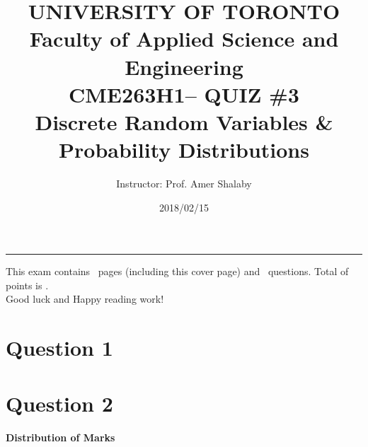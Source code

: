 \documentclass[letterpaper,12pt,addpoints]{exam}
\newcommand{\university}{UNIVERSITY OF TORONTO}
\newcommand{\faculty}{Faculty of Applied Science and Engineering}
\newcommand{\class}{CME263H1}
\newcommand{\examnum}{QUIZ \#3}
\newcommand{\content}{Discrete Random Variables \& Probability Distributions}
\newcommand{\examdate}{2018/02/15}
\begin{document}
\title{\@@title}
\title{\Large \textbf{\university\\ \faculty\\
\bigskip
\class -- \examnum \\ \content}}
\author{Instructor: Prof. Amer Shalaby}
\date{\examdate}
\maketitle
\begin{flushleft}
\medskip
{}
\end{flushleft}
\noindent \rule{\textwidth}{1pt}

\noindent This exam contains \numpages\ pages (including this cover page) and \numquestions\ questions. Total of points is \numpoints.\\
Good luck and Happy reading work!



\section*{Question 1}

\section*{Question 2}

\begin{center}
\textbf{Distribution of Marks}\\
\medskip
\gradetable[v][questions]
\end{center}
\end{document}

